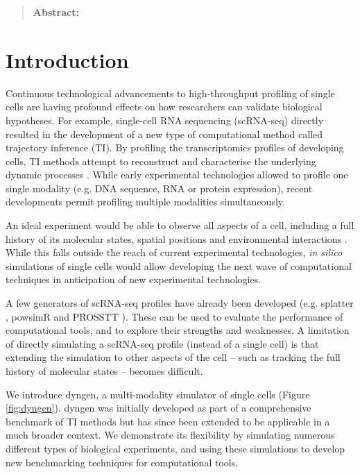 \begin{quote}
	\textbf{Abstract:} 
\end{quote}

\section{Introduction}
Continuous technological advancements to high-throughput profiling of single cells
are having profound effects on how researchers can validate biological hypotheses. 
For example, single-cell RNA sequencing (scRNA-seq) directly resulted in the development
of a new type of computational method called trajectory inference (TI). By profiling
the transcriptomics profiles of developing cells, TI methods attempt to reconstruct 
and characterise the underlying dynamic processes \cite{cannoodt_computationalmethodstrajectory_2016}.
While early experimental technologies allowed to profile one single modality (e.g. DNA sequence, 
RNA or protein expression), recent developments permit profiling multiple modalities simultaneously.

An ideal experiment would be able to observe all aspects of a cell, including a full history of its 
molecular states, spatial positions and environmental interactions \cite{stuart_integrativesinglecellanalysis_2019}. 
While this falls outside the reach of current experimental technologies, \textit{in silico} simulations
of single cells would allow developing the next wave of computational techniques
in anticipation of new experimental technologies.

A few generators of scRNA-seq profiles have already been developed (e.g. splatter \cite{zappia_splattersimulationsinglecell_2017}, powsimR \cite{vieth_powsimrpoweranalysis_2017} and PROSSTT \cite{papadopoulos_prossttprobabilisticsimulation_2018}). %
These can be used to evaluate the performance of computational tools, and to explore their strengths and weaknesses. A limitation of directly simulating a scRNA-seq profile (instead of a single cell) is that extending the simulation to other aspects of the cell -- such as tracking the full history of molecular states -- becomes difficult.

We introduce dyngen, a multi-modality simulator of single cells (Figure \ref{fig:dyngen}).
dyngen was initially developed as part of a comprehensive benchmark of TI methods \cite{saelens_comparisonsinglecelltrajectory_2019} but has since been extended to be applicable in a much broader context.
We demonstrate its flexibility by simulating numerous different types of biological experiments, and using these simulations to develop new benchmarking techniques for computational tools.


